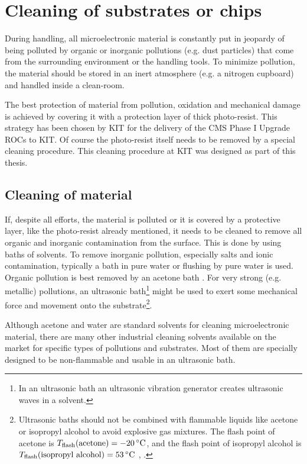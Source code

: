 \acresetall
\chapter{Cleaning of substrates or chips}\label{cha:cleaning}
During handling, all microelectronic material is constantly put in jeopardy of being polluted by organic or inorganic pollutions (e.g. dust particles) that come from the surrounding environment or the handling tools. To minimize pollution, the material should be stored in an inert atmosphere (e.g. a nitrogen cupboard) and handled inside a clean-room.

The best protection of material from pollution, oxidation and mechanical damage is achieved by covering it with a protection layer of thick photo-resist. This strategy has been chosen by \ac{KIT} for the delivery of the \ac{CMS} Phase I Upgrade \ac{ROC}s to \ac{KIT}. Of course the photo-resist itself needs to be removed by a special cleaning procedure. This cleaning procedure at \ac{KIT} was designed as part of this thesis.

\section{Cleaning of material}
If, despite all efforts, the material is polluted or it is covered by a protective layer, like the photo-resist already mentioned, it needs to be cleaned to remove all organic and inorganic contamination from the surface. This is done by using baths of solvents. To remove inorganic pollution, especially salts and ionic contamination, typically a bath in pure water or flushing by pure water is used. Organic pollution is best removed by an acetone bath \cite{NLM14a}. For very strong (e.g. metallic) pollutions, an ultrasonic bath\footnote{In an ultrasonic bath an ultrasonic vibration generator creates ultrasonic waves in a solvent.} might be used to exert some mechanical force and movement onto the substrate\footnote{Ultrasonic baths should not be combined with flammable liquids like acetone or isopropyl alcohol to avoid explosive gas mixtures. The flash point of acetone is $T_{\rm{flash}}(\rm{acetone})=-20\, ^{\circ} \rm{C}$, and the flash point of isopropyl alcohol is $T_{\rm{flash}}(\rm{isopropyl\text{ }alcohol})=53\, ^{\circ} \rm{C}$  \cite{NLM14a}, \cite{NLM14b}.}.

Although acetone and water are standard solvents for cleaning microelectronic material, there are many other industrial cleaning solvents available on the market for specific types of pollutions and substrates. Most of them are specially designed to be non-flammable and usable in an ultrasonic bath.

